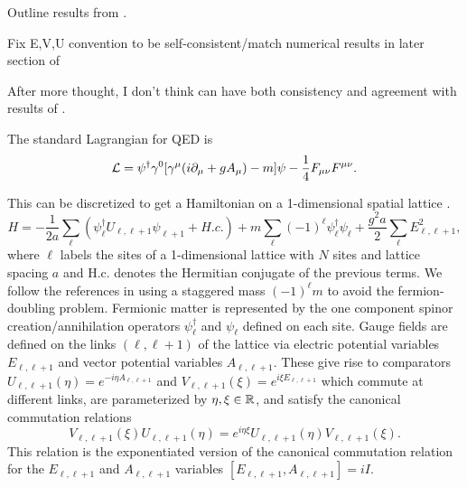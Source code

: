 \documentclass[10pt,reqno]{amsart}
\begin{document}
	Outline results from \cite{Ercolessi18,Notarnicola15,Wiese13}.
	
	Fix E,V,U convention to be self-consistent/match numerical results in later section of \cite{Ercolessi18}
	
	After more thought, I don't think can have both consistency and agreement with results of \cite{Ercolessi18}.
	
	The standard Lagrangian for QED is 
	\begin{equation}
		\mathcal{L} = \psi^\dagger\gamma^0[\gamma^\mu(i\partial_\mu+gA_\mu)-m]\psi -\frac{1}{4}F_{\mu\nu}F^{\mu\nu}.
	\end{equation}
	
	This can be discretized to get a Hamiltonian on a 1-dimensional spatial lattice \cite{Ercolessi18,Notarnicola15,Wiese13}.
	\begin{equation}\label{eq:1dQEDLatticeHamiltonian}
		H=-\frac{1}{2a} \sum_\ell (\psi_\ell^\dagger U_{\ell,\ell+1}\psi_{\ell+1}+H.c.) + m\sum_\ell (-1)^\ell \psi_\ell^\dagger\psi_\ell+ \frac{g^2 a}{2} \sum_{\ell} E_{\ell,\ell+1}^2,		
	\end{equation}
	where $\ell$ labels the sites of a 1-dimensional lattice with $N$ sites and lattice spacing $a$ and H.c. denotes the Hermitian conjugate of the previous terms. 
	We follow the references in using a staggered mass $(-1)^\ell m$ to avoid the fermion-doubling problem.
	Fermionic matter is represented by the one component spinor creation/annihilation operators $\psi_\ell^\dagger$ and $\psi_\ell$ defined on each site.
	Gauge fields are defined on the links $(\ell,\ell+1)$ of the lattice via electric potential variables $E_{\ell,\ell+1}$ and vector potential variables $A_{\ell,\ell+1}$.
	These give rise to comparators $U_{\ell,\ell+1}(\eta)=e^{-i\eta A_{\ell,\ell+1}}$ and $V_{{\ell,\ell+1}}(\xi)=e^{i\xi E_{\ell,\ell+1}}$ which commute at different links, are parameterized by $\eta,\xi \in \mathbb{R}$, and satisfy the canonical commutation relations
	\begin{equation}\label{eq:1dQEDunitaryCCR}
		V_{\ell,\ell+1}(\xi)U_{\ell,\ell+1}(\eta)=e^{i\eta\xi}U_{\ell,\ell+1}(\eta)V_{\ell,\ell+1}(\xi).
	\end{equation}
	This relation is the exponentiated version of the canonical commutation relation for the $E_{\ell,\ell+1}$ and $A_{\ell,\ell+1}$ variables $[E_{\ell,\ell+1},A_{\ell,\ell+1}]=iI$.
	
\end{document}

